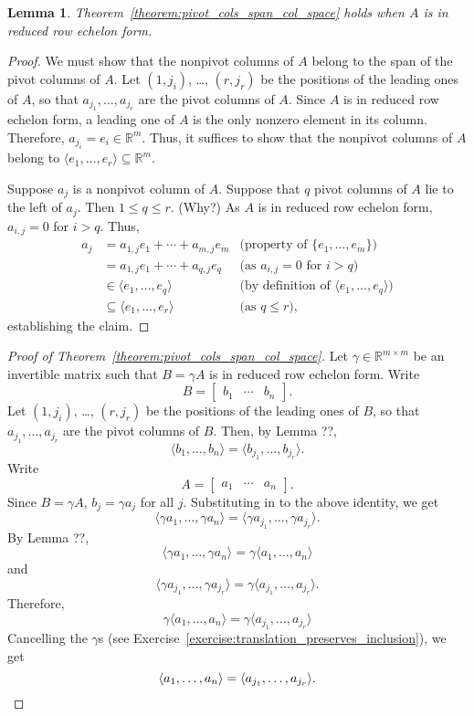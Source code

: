 \documentclass[fullpage]{amsart}
\newcommand{\RR}{\mathbb{R}}
\newtheorem{lemma}[theorem]{Lemma}
\theoremstyle{definition}
\begin{document}
\begin{lemma}
Theorem~\ref{theorem:pivot_cols_span_col_space} holds when $A$ is in reduced row echelon form.
\end{lemma}

\begin{proof}
We must show that the nonpivot columns of $A$ belong to the span of the pivot columns of $A$.
Let $(1, j_i)$, \ldots, $(r, j_r)$ be the positions of the leading ones of $A$, so that $a_{j_1},\ldots,a_{j_r}$ are the pivot columns of $A$.
Since $A$ is in reduced row echelon form, a leading one of $A$ is the only nonzero element in its column.
Therefore, $a_{j_i}=e_i\in\RR^m.$
Thus, it suffices to show that the nonpivot columns of $A$ belong to $\langle e_1,\ldots,e_r\rangle\subseteq \RR^m$.

Suppose $a_j$ is a nonpivot column of $A$.
Suppose that $q$ pivot columns of $A$ lie to the left of $a_j$.
Then $1\leq q\leq r$. (Why?)
As $A$ is in reduced row echelon form, $a_{i,j}=0$ for $i>q$.
Thus,
\begin{align*}
a_j &= a_{1,j}e_1 + \cdots + a_{m,j}e_m &\text{(property of $\{e_1,\ldots,e_m\}$)}\\
&= a_{1,j}e_1 + \cdots + a_{q,j}e_q &\text{(as $a_{i,j}=0$ for $i>q$)}\\
& \in \langle e_1,\ldots,e_q\rangle &\text{(by definition of $\langle e_1,\ldots,e_q\rangle$)}\\
&\subseteq \langle e_1,\ldots,e_r\rangle &\text{(as $q\leq r$)},
\end{align*}
establishing the claim.
\end{proof}

\begin{proof}[{Proof of Theorem~\ref{theorem:pivot_cols_span_col_space}}]
Let $\gamma\in\RR^{m\times m}$ be an invertible matrix such that $B= \gamma A$ is in reduced row echelon form. 
Write
$$
B=\begin{bmatrix}b_1&\cdots&b_n\end{bmatrix}.
$$
Let $(1, j_i)$, \ldots, $(r, j_r)$ be the positions of the leading ones of $B$, so that $a_{j_1},\ldots,a_{j_r}$ are the pivot columns of $B$.
Then, by Lemma ??,
$$
\langle b_1,\ldots,b_n\rangle = \langle b_{j_1},\ldots,b_{j_r}\rangle.
$$
Write
$$
A=\begin{bmatrix}a_1&\cdots&a_n\end{bmatrix}.
$$
Since $B=\gamma A$, $b_j = \gamma a_j$ for all $j$. Substituting in to the above identity, we get
$$
\langle \gamma a_1,\ldots,\gamma a_n\rangle = \langle \gamma a_{j_1},\ldots,\gamma a_{j_r}\rangle.
$$
By Lemma ??,
$$
\langle \gamma a_1,\ldots,\gamma a_n\rangle = \gamma \langle a_1,\ldots,a_n\rangle
$$
and
$$
\langle \gamma a_{j_1},\ldots,\gamma a_{j_r}\rangle = \gamma \langle a_{j_1},\ldots,a_{j_r}\rangle.
$$
Therefore,
$$
\gamma \langle a_1,\ldots,a_n\rangle = \gamma \langle a_{j_1},\ldots,a_{j_r}\rangle
$$
Cancelling the $\gamma$s (see Exercise~\ref{exercise:translation_preserves_inclusion}),  we get
\[
\langle a_1,\ldots,a_n\rangle =  \langle a_{j_1},\ldots,a_{j_r}\rangle\qedhere.
\]
\end{proof}
\end{document}
